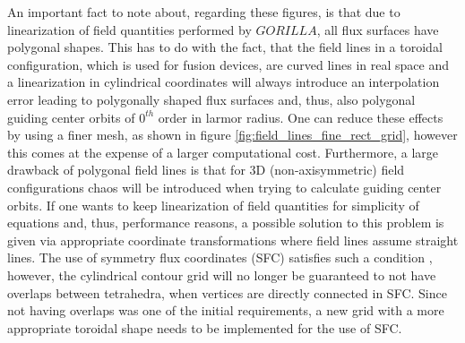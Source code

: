 \documentclass[./main.tex]{subfiles}
\begin{document}
An important fact to note about, regarding these figures, is that due to linearization of field quantities performed by $GORILLA$, all flux surfaces have polygonal shapes. This has to do with the fact, that the field lines in a toroidal configuration, which is used for fusion devices, are curved lines in real space and a linearization in cylindrical coordinates will always introduce an interpolation error leading to polygonally shaped flux surfaces and, thus, also polygonal guiding center orbits of $0^{th}$ order in larmor radius. One can reduce these effects by using a finer mesh, as shown in figure \ref{fig:field_lines_fine_rect_grid}, however this comes at the expense of a larger computational cost.
Furthermore, a large drawback of polygonal field lines is that for 3D (non-axisymmetric) field configurations chaos will be introduced when trying to calculate guiding center orbits. If one wants to keep linearization of field quantities for simplicity of equations and, thus, performance reasons, a possible solution to this problem is given via appropriate coordinate transformations where field lines assume straight lines. The use of symmetry flux coordinates (SFC) satisfies such a condition \cite{haeseleer}, however, the cylindrical contour grid will no longer be guaranteed to not have overlaps between tetrahedra, when vertices are directly connected in SFC. Since not having overlaps was one of the initial requirements, a new grid with a more appropriate toroidal shape needs to be implemented for the use of SFC.

\end{document}
